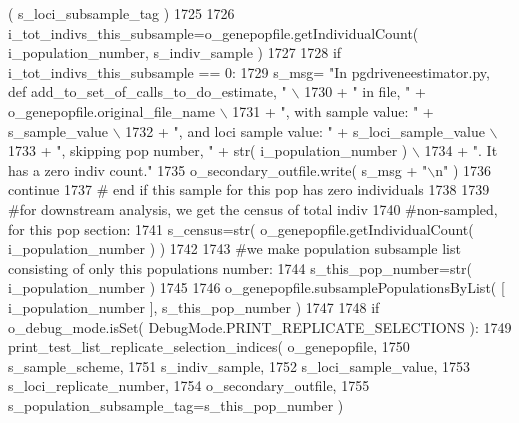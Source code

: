 \begin{DoxyCode}
      ( s\_loci\_subsample\_tag )
1725 
1726                 i\_tot\_indivs\_this\_subsample=o\_genepopfile.getIndividualCount( i\_population\_number, 
      s\_indiv\_sample )
1727 
1728                 \textcolor{keywordflow}{if} i\_tot\_indivs\_this\_subsample == 0:
1729                     s\_msg= \textcolor{stringliteral}{"In pgdriveneestimator.py, def add\_to\_set\_of\_calls\_to\_do\_estimate, "} \(\backslash\)
1730                                     + \textcolor{stringliteral}{" in file, "} + o\_genepopfile.original\_file\_name \(\backslash\)
1731                                     + \textcolor{stringliteral}{", with sample value: "} + s\_sample\_value \(\backslash\)
1732                                     + \textcolor{stringliteral}{", and loci sample value: "} + s\_loci\_sample\_value \(\backslash\)
1733                                     + \textcolor{stringliteral}{", skipping pop number, "}  + str( i\_population\_number ) \(\backslash\)
1734                                     + \textcolor{stringliteral}{".  It has a zero indiv count."}
1735                     o\_secondary\_outfile.write( s\_msg + \textcolor{stringliteral}{"\(\backslash\)n"} )
1736                     \textcolor{keywordflow}{continue}
1737                 \textcolor{comment}{# end if this sample for this pop has zero individuals}
1738 
1739                 \textcolor{comment}{#for downstream analysis, we get the census of total indiv}
1740                 \textcolor{comment}{#non-sampled, for this pop section:}
1741                 s\_census=str( o\_genepopfile.getIndividualCount( i\_population\_number ) )
1742 
1743                 \textcolor{comment}{#we make population subsample list consisting of only this populations number:}
1744                 s\_this\_pop\_number=str( i\_population\_number ) 
1745 
1746                 o\_genepopfile.subsamplePopulationsByList( [ i\_population\_number ], s\_this\_pop\_number )
1747 
1748                 \textcolor{keywordflow}{if} o\_debug\_mode.isSet( DebugMode.PRINT\_REPLICATE\_SELECTIONS ):
1749                     print\_test\_list\_replicate\_selection\_indices( o\_genepopfile, 
1750                                             s\_sample\_scheme,    
1751                                             s\_indiv\_sample, 
1752                                             s\_loci\_sample\_value,
1753                                             s\_loci\_replicate\_number,
1754                                             o\_secondary\_outfile, 
1755                                             s\_population\_subsample\_tag=s\_this\_pop\_number )

\end{DoxyCode}
